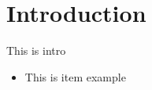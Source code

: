 \section{Introduction}
\noindent This is intro
\begin{itemize}
\item This is item example
\end{itemize}
